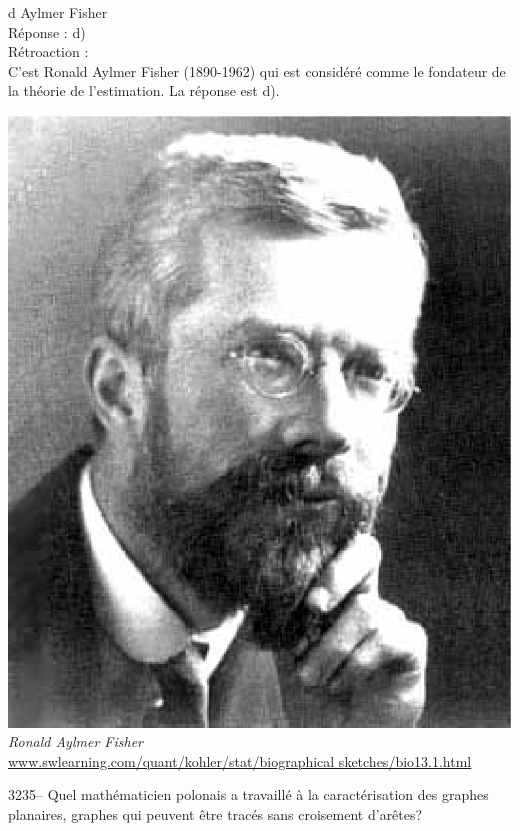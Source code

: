 \documentclass[letterpaper, 12pt]{article}
\begin{document}
d Aylmer Fisher\\

R\'eponse : d)\\

R\'etroaction :\\
C'est Ronald Aylmer Fisher (1890-1962) qui est consid\'er\'e comme le fondateur de la th\'eorie de l'estimation. La r\'eponse est d).
\begin{center}
\includegraphics[scale=0.27]{Fisher.eps}\\
\emph{{\small Ronald Aylmer Fisher}}\\
\href{http://www.swlearning.com/quant/kohler/stat/biographical_sketches/bio13.1.html}{www.swlearning.com/quant/kohler/stat/biographical sketches/bio13.1.html}\\[5mm]
\end{center}



3235-- Quel math\'ematicien polonais a travaill\'e \`a la caract\'erisation des graphes planaires, graphes qui peuvent \^etre trac\'es sans croisement d'ar\^etes?\\
\end{document}
